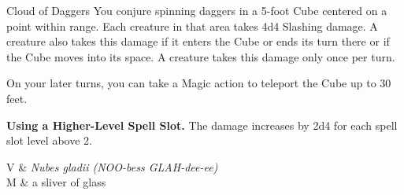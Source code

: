 \begin{Spell}[
  tags=Concentration,
  level=2nd,
  time=1 Action,
  range=60 ft/5 ft cube,
  components={V, S, M},
  duration=1 Minute,
  school=Conjuration,
  attack=None,
  effect=Slashing
]{Cloud of Daggers}
You conjure spinning daggers in a 5-foot Cube centered on a point within range. Each creature in that area takes 4d4 Slashing damage. A creature also takes this damage if it enters the Cube or ends its turn there or if the Cube moves into its space. A creature takes this damage only once per turn.

On your later turns, you can take a Magic action to teleport the Cube up to 30 feet.

\textbf{Using a Higher-Level Spell Slot.} The damage increases by 2d4 for each spell slot level above 2.

\begin{components}
V & \textit{Nubes gladii (NOO-bess GLAH-dee-ee)} \\
M & a sliver of glass
\end{components}
\end{Spell}


